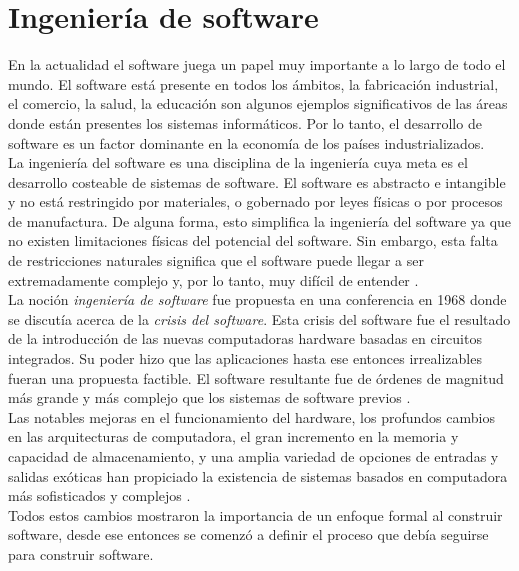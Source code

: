 \section{Ingeniería de software}
En la actualidad el software juega un papel muy importante a lo largo de todo el mundo. El software está presente en todos los ámbitos,
la fabricación industrial, el comercio, la salud, la educación son algunos ejemplos significativos de las áreas donde están presentes los 
sistemas informáticos. Por lo tanto, el desarrollo de software es un factor dominante en la economía de los países industrializados.\\

La ingeniería del software es una disciplina de la ingeniería cuya meta es el desarrollo costeable de sistemas de software. El software es
abstracto e intangible y no está restringido por materiales, o gobernado por leyes físicas o por procesos de manufactura. De alguna forma, esto
simplifica la ingeniería del software ya que no existen limitaciones físicas del potencial del software. 
Sin embargo, esta falta de restricciones naturales significa que el software puede llegar a ser extremadamente complejo y, por lo tanto, muy difícil de entender \cite{sommerville1992software}.\\

La noción \emph{ingeniería de software} fue propuesta en una conferencia en 1968 donde se discutía acerca de la \emph{crisis del software}. Esta crisis del software
fue el resultado de la introducción de las nuevas computadoras hardware basadas en circuitos integrados. Su poder hizo que las aplicaciones
hasta ese entonces irrealizables fueran una propuesta factible. El software resultante fue de órdenes de magnitud más grande y más
complejo que los sistemas de software previos \cite{sommerville1992software}.\\

Las notables mejoras en el funcionamiento del hardware, los profundos cambios en las arquitecturas de computadora, 
el gran incremento en la memoria y capacidad de almacenamiento, y
una amplia variedad de opciones de entradas y salidas exóticas han propiciado la existencia de
sistemas basados en computadora más sofisticados y complejos \cite{pressman2005software}.\\

Todos estos cambios mostraron la importancia de un enfoque formal al construir software, desde ese entonces 
se comenzó a definir el proceso que debía seguirse para construir software.\\

